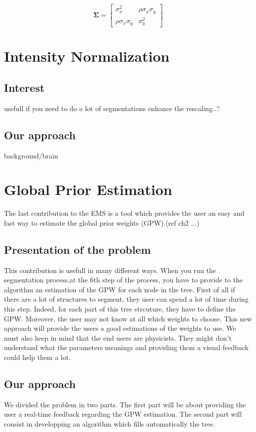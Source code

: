 \begin{equation*}
\mathbf{\Sigma} = 
 \begin{bmatrix}
   \sigma_x^2 & \rho \sigma_x \sigma_y \\
   \rho \sigma_x \sigma_y & \sigma_y^2
 \end{bmatrix}
\end{equation*}


\section{Intensity Normalization}
\subsection{Interest}
usefull if you need to do a lot of segmentations
enhance the rescaling..?
\subsection{Our approach}
background/brain
%


\section{Global Prior Estimation}

The last contribution to the EMS is a tool which provides the user an easy and fast way to estimate the global prior weights (GPW).(ref ch2 ...)

\subsection{Presentation of the problem}
This contribution is usefull in many different ways.
When you run the segmentation process,at the 6th step of the process, you have to provide to the algorithm an estimation of the GPW for each node in the tree. 
First of all if there are a lot of structures to segment, they user can spend a lot of time during this step. Indeed, for each part of this tree strcuture, they have to define the GPW. Moreover, the user may not know at all which weights to choose. This new approach will provide the users a good estimations of the weights to use. We must also keep in mind that the end users are physicists. They might don't understand what the parameters meanings and providing them a visual feedback could help them a lot.
\subsection{Our approach}
We divided the problem in two parts. The first part will be about providing the user a real-time feedback regarding the GPW estimation.
The second part will consist in developping an algorithm which fills automatically the tree.
